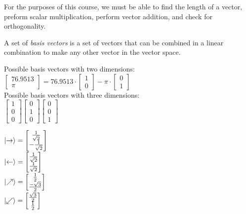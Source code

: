 \begin{note}
  For the purposes of this course, we must be able to find the length of a vector, preform scalar multiplication, perform vector addition, and check for orthogonality.
\end{note}

\begin{definition}
  A set of \emph{basis vectors} is a set of vectors that can be combined in a linear combination to make any other vector in the vector space.
\end{definition}
\begin{example}
  Possible basis vectors with two dimensions:\\
  $\begin{bmatrix}
    76.9513\\
    \pi
  \end{bmatrix} = 76.9513 \cdot \begin{bmatrix}
    1\\
    0
  \end{bmatrix} - \pi \cdot \begin{bmatrix}
    0\\
    1
  \end{bmatrix}$\\
  Possible basis vectors with three dimensions:\\
  $\begin{bmatrix}
    1\\
    0\\
    0
  \end{bmatrix} \begin{bmatrix}
    0\\
    1\\
    0
  \end{bmatrix} \begin{bmatrix}
    0\\
    0\\
    1
  \end{bmatrix}$
\end{example}

\begin{note}
  $\lvert\rightarrow\rangle = \begin{bmatrix}
    \frac{1}{\sqrt{2}}\\
    -\frac{1}{\sqrt{2}}
  \end{bmatrix}$\\
  $\lvert\leftarrow\rangle = \begin{bmatrix}
    \frac{1}{\sqrt{2}}\\
    \frac{1}{\sqrt{2}}
  \end{bmatrix}$\\
  $\lvert\nearrow\rangle = \begin{bmatrix}
    \frac{1}{2}\\
    \frac{-\sqrt{3}}{2}
  \end{bmatrix}$\\
  $\lvert\swarrow\rangle = \begin{bmatrix}
    \frac{\sqrt{3}}{2}\\
    \frac{1}{2}
  \end{bmatrix}$
\end{note}

